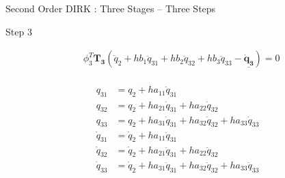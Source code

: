 \documentclass{beamer}
\begin{document}
\begin{frame}[allowframebreaks]{Second Order DIRK : Three Stages -- Three Steps}
{\begin{block}{Step 3}
\begin{minipage}{1.0\textwidth}
\begin{minipage}{1.0\textwidth}
\begin{equation}
\begin{split}
          &\phi_3^T \mathbf{T_3}(\dot{q}_2 + h b_1 \ddot{q}_{31} +  h b_2 \ddot{q}_{32}  +  h b_3 \ddot{q}_{33} - \underline{\mathbf{\dot{q}_3}} ) = 0\\
        \end{split}
      \end{equation}
    \end{minipage}
  \end{minipage}
\end{block}
\begin{minipage}{1.0\textwidth}
  \begin{equation}\nonumber
    \begin{split}
      q_{31} &= q_2 + h a_{11} \dot{q}_{31} \\
      q_{32} &= q_2 + h a_{21} \dot{q}_{31} + h a_{22} \dot{q}_{32} \\
      q_{33} &= q_2 + h a_{31} \dot{q}_{31} + h a_{32} \dot{q}_{32}+ h a_{33} \dot{q}_{33}  \\\hline
      \dot{q}_{31} &= \dot{q}_2 + h a_{11} \ddot{q}_{31} \\
      \dot{q}_{32} &= \dot{q}_2 + h a_{21} \ddot{q}_{31} + h a_{22} \ddot{q}_{32} \\
      \dot{q}_{33} &= \dot{q}_2 + h a_{31} \ddot{q}_{31} + h a_{32} \ddot{q}_{32} + h a_{33} \ddot{q}_{33} \\
    \end{split}
  \end{equation}
\end{minipage}
}

\framebreak


\end{frame}
\end{document}
